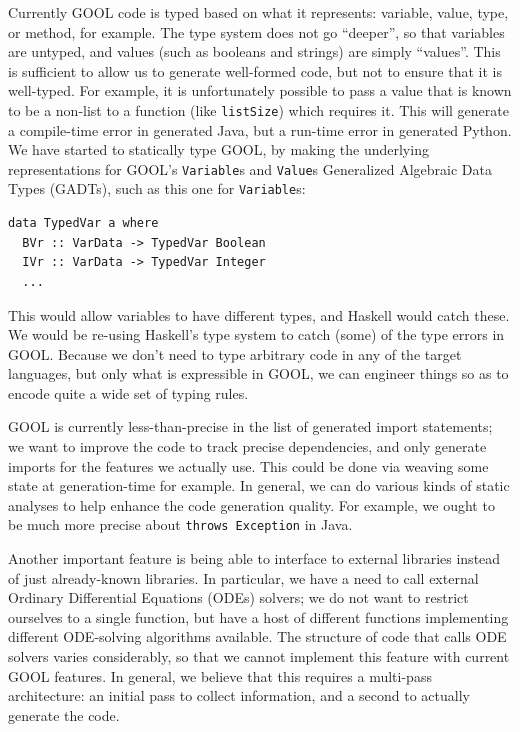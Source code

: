 \documentclass[sigplan,review,anonymous,prologue,dvipsnames]{acmart}
\begin{document}
Currently GOOL code is typed based on what it represents:
variable, value, type, or method, for example. The type system does not
go ``deeper'', so that variables are untyped, and values (such as booleans
and strings) are simply ``values''.  This is sufficient to allow us to
generate well-formed code, but not to ensure that it is well-typed.
For example, it is unfortunately possible to pass a value that is known
to be a non-list to a function (like \verb|listSize|) which requires it.
This will generate a compile-time error in generated Java, but a run-time error
in generated Python.  We have started to statically type GOOL, by making
the underlying representations for 
GOOL's \verb|Variable|s and \verb|Value|s Generalized Algebraic Data Types
(GADTs), such as this one for \verb|Variable|s:
\begin{lstlisting}
data TypedVar a where
  BVr :: VarData -> TypedVar Boolean
  IVr :: VarData -> TypedVar Integer
  ...
\end{lstlisting}
This would allow variables to have different types, and Haskell would catch
these. We would be re-using Haskell's type system to catch (some) of the
type errors in GOOL.  Because we don't need to type arbitrary code in any
of the target languages, but only what is expressible in GOOL, we can
engineer things so as to encode quite a wide set of typing rules.

GOOL is currently less-than-precise in the list of generated import statements;
we want to improve the code to track precise dependencies, and only generate
imports for the features we actually use. This could be done via weaving
some state at generation-time for example.  In general, we can do various 
kinds of static analyses to help enhance the code generation quality.
For example, we ought to be much more precise about \verb|throws Exception|
in Java.

Another important feature is being able to interface to external libraries
instead of just already-known libraries. In particular, we have a need to
call external Ordinary Differential Equations (ODEs) solvers; we do not
want to restrict ourselves to a single function, but have a host of
different functions implementing different ODE-solving algorithms available.
The structure of code that calls ODE solvers varies considerably, so that we cannot
implement this feature with current GOOL features.  In general, we believe
that this requires a multi-pass architecture: an initial pass to collect
information, and a second to actually generate the code.
\end{document}
